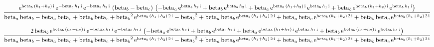 \documentclass[9pt]{article}
\begin{document}
  \begin{equation}
    \centering
    \frac{\mathrm{e}^{\mathrm{beta}_{b}\, \left(h_{1} + h_{2}\right)\, \mathrm{i}}\, \mathrm{e}^{- \mathrm{beta}_{b}\, h_{1}\, \mathrm{i}}\, \mathrm{e}^{- \mathrm{beta}_{b}\, h_{2}\, \mathrm{i}}\, \left(\mathrm{beta}_{b} - \mathrm{beta}_{c}\right)\, \left( - \mathrm{beta}_{a}\, \mathrm{e}^{\mathrm{beta}_{b}\, h_{2}\, \mathrm{i}} + \mathrm{beta}_{b}\, \mathrm{e}^{\mathrm{beta}_{b}\, h_{2}\, \mathrm{i}} + \mathrm{beta}_{a}\, \mathrm{e}^{\mathrm{beta}_{b}\, \left(h_{1} + h_{2}\right)\, \mathrm{i}}\, \mathrm{e}^{\mathrm{beta}_{b}\, h_{1}\, \mathrm{i}} + \mathrm{beta}_{b}\, \mathrm{e}^{\mathrm{beta}_{b}\, \left(h_{1} + h_{2}\right)\, \mathrm{i}}\, \mathrm{e}^{\mathrm{beta}_{b}\, h_{1}\, \mathrm{i}}\right)}{\mathrm{beta}_{a}\, \mathrm{beta}_{b} - \mathrm{beta}_{a}\, \mathrm{beta}_{c} + \mathrm{beta}_{b}\, \mathrm{beta}_{c} + {\mathrm{beta}_{b}}^2\, \mathrm{e}^{\mathrm{beta}_{b}\, \left(h_{1} + h_{2}\right)\, 2\, \mathrm{i}} - {\mathrm{beta}_{b}}^2 + \mathrm{beta}_{a}\, \mathrm{beta}_{b}\, \mathrm{e}^{\mathrm{beta}_{b}\, \left(h_{1} + h_{2}\right)\, 2\, \mathrm{i}} + \mathrm{beta}_{a}\, \mathrm{beta}_{c}\, \mathrm{e}^{\mathrm{beta}_{b}\, \left(h_{1} + h_{2}\right)\, 2\, \mathrm{i}} + \mathrm{beta}_{b}\, \mathrm{beta}_{c}\, \mathrm{e}^{\mathrm{beta}_{b}\, \left(h_{1} + h_{2}\right)\, 2\, \mathrm{i}}}
    \label{eq:X3}
  \end{equation}


  \begin{equation}
    \centering
    \frac{2\, \mathrm{beta}_{b}\, \mathrm{e}^{\mathrm{beta}_{b}\, \left(h_{1} + h_{2}\right)\, \mathrm{i}}\, \mathrm{e}^{- \mathrm{beta}_{b}\, h_{1}\, \mathrm{i}}\, \mathrm{e}^{- \mathrm{beta}_{b}\, h_{2}\, \mathrm{i}}\, \left( - \mathrm{beta}_{a}\, \mathrm{e}^{\mathrm{beta}_{b}\, h_{2}\, \mathrm{i}} + \mathrm{beta}_{b}\, \mathrm{e}^{\mathrm{beta}_{b}\, h_{2}\, \mathrm{i}} + \mathrm{beta}_{a}\, \mathrm{e}^{\mathrm{beta}_{b}\, \left(h_{1} + h_{2}\right)\, \mathrm{i}}\, \mathrm{e}^{\mathrm{beta}_{b}\, h_{1}\, \mathrm{i}} + \mathrm{beta}_{b}\, \mathrm{e}^{\mathrm{beta}_{b}\, \left(h_{1} + h_{2}\right)\, \mathrm{i}}\, \mathrm{e}^{\mathrm{beta}_{b}\, h_{1}\, \mathrm{i}}\right)}{\mathrm{beta}_{a}\, \mathrm{beta}_{b} - \mathrm{beta}_{a}\, \mathrm{beta}_{c} + \mathrm{beta}_{b}\, \mathrm{beta}_{c} + {\mathrm{beta}_{b}}^2\, \mathrm{e}^{\mathrm{beta}_{b}\, \left(h_{1} + h_{2}\right)\, 2\, \mathrm{i}} - {\mathrm{beta}_{b}}^2 + \mathrm{beta}_{a}\, \mathrm{beta}_{b}\, \mathrm{e}^{\mathrm{beta}_{b}\, \left(h_{1} + h_{2}\right)\, 2\, \mathrm{i}} + \mathrm{beta}_{a}\, \mathrm{beta}_{c}\, \mathrm{e}^{\mathrm{beta}_{b}\, \left(h_{1} + h_{2}\right)\, 2\, \mathrm{i}} + \mathrm{beta}_{b}\, \mathrm{beta}_{c}\, \mathrm{e}^{\mathrm{beta}_{b}\, \left(h_{1} + h_{2}\right)\, 2\, \mathrm{i}}}
    \label{eq:X4}
  \end{equation}
\end{document}
